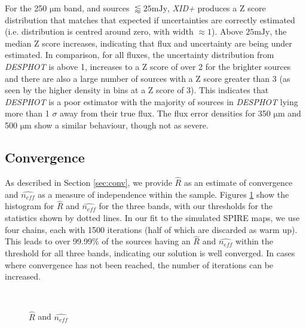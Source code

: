 \documentclass[useAMS,usenatbib]{mnras}
\begin{document}
For the 250 $\mathrm{\mu m}$ band, and sources $\lessapprox25\mathrm{m Jy}$, \emph{XID+} produces a Z score distribution that matches that expected if uncertainties are correctly estimated (i.e. distribution is centred around zero, with width $\approx 1$). Above $25\mathrm{mJy}$, the median Z score increases, indicating that flux and uncertainty are being under estimated. In comparison, for all fluxes, the uncertainty distribution from \emph{DESPHOT} is above 1, increases to a Z score of over 2 for the brighter sources and there are also a large number of sources with a Z score greater than 3 (as seen by the higher density in bins at a Z score of 3). This indicates that \emph{DESPHOT} is a poor estimator with the majority of sources in \emph{DESPHOT} lying more than 1 $\sigma$ away from their true flux. The flux error densities for 350 $\mathrm{\mu m}$ and 500 $\mathrm{\mu m}$ show a similar behaviour, though not as severe.

\subsection{Convergence}
As described in Section \ref{sec:conv}, we provide $\hat{R}$ as an estimate of convergence and $\hat{n_{eff}}$ as a measure of independence within the sample. Figures \ref{fig:converg} show the histogram for $\hat{R}$ and $\hat{n_{eff}}$ for the three bands, with our thresholds for the statistics shown by dotted lines. In our fit to the simulated SPIRE maps, we use four chains, each with 1500 iterations (half of which are discarded as warm up). This leads to over 99.99\% of the sources having an $\hat{R}$ and $\hat{n_{eff}}$ within the threshold for all three bands, indicating our solution is well converged. In cases where convergence has not been reached, the number of iterations can be increased.
\begin{figure}
\\
\caption{$\hat{R}$ and $\hat{n_{eff}}$}\label{fig:converg}
\end{figure}
\end{document}
